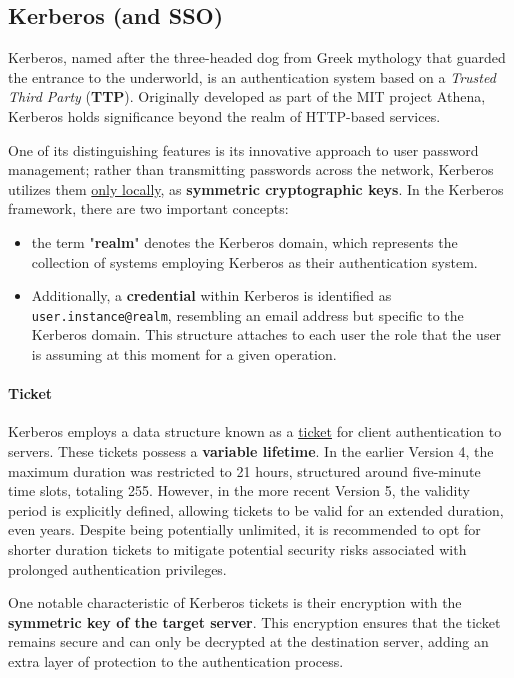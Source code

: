 \subsection{Kerberos (and SSO)}

Kerberos, named after the three-headed dog from Greek mythology that guarded the entrance to the underworld, is an authentication system based on a \textit{Trusted Third Party} (\textbf{TTP}).
Originally developed as part of the MIT project Athena, Kerberos holds significance beyond the realm of HTTP-based services.

One of its distinguishing features is its innovative approach to user password management; rather than transmitting passwords across the network, Kerberos utilizes them \underline{only locally}, as \textbf{symmetric cryptographic keys}.
In the Kerberos framework, there are two important concepts:
\begin{itemize}
	\item the term "\textbf{realm}" denotes the Kerberos domain, which represents the collection of systems employing Kerberos as their authentication system.
	\item Additionally, a \textbf{credential} within Kerberos is identified as \texttt{user.instance@realm}, resembling an email address but specific to the Kerberos domain. This structure attaches to each user the role that the user is assuming at this moment for a given operation.
\end{itemize}


\paragraph{Ticket}
Kerberos employs a data structure known as a \underline{ticket} for client authentication to servers. These tickets possess a \textbf{variable lifetime}. In the earlier Version 4, the maximum duration was restricted to 21 hours, structured around five-minute time slots, totaling 255. However, in the more recent Version 5, the validity period is explicitly defined, allowing tickets to be valid for an extended duration, even years. Despite being potentially unlimited, it is recommended to opt for shorter duration tickets to mitigate potential security risks associated with prolonged authentication privileges.

One notable characteristic of Kerberos tickets is their encryption with the \textbf{symmetric key of the target server}. This encryption ensures that the ticket remains secure and can only be decrypted at the destination server, adding an extra layer of protection to the authentication process.

